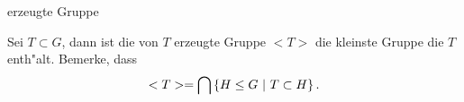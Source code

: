 \documentclass[class=article, crop=false]{standalone}
\begin{document}
\begin{zettel}{erzeugte Gruppe}
\begin{flashcard}
    \begin{definition}
        Sei $T \subset G$, dann ist die von $T$ erzeugte Gruppe $ <T>$ die kleinste Gruppe die $T$ enth"alt.
        Bemerke, dass
\[
        <T> = \bigcap \set{H \leq G}{T \subset H}
.\]
\end{definition}

\end{flashcard}
\end{zettel}
\end{document}
